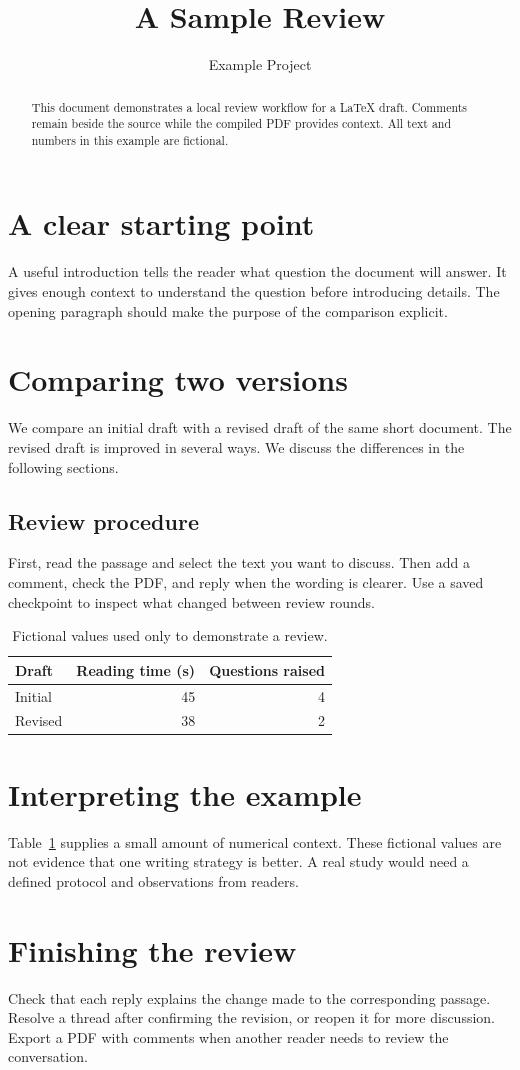 \documentclass[11pt]{article}
\title{A Sample Review}
\author{Example Project}
\date{}
\begin{document}
\maketitle

\begin{abstract}
This document demonstrates a local review workflow for a LaTeX draft.
Comments remain beside the source while the compiled PDF provides context.
All text and numbers in this example are fictional.
\end{abstract}

\section{A clear starting point}
A useful introduction tells the reader what question the document will answer.
It gives enough context to understand the question before introducing details.
The opening paragraph should make the purpose of the comparison explicit.

\section{Comparing two versions}
We compare an initial draft with a revised draft of the same short document.
The revised draft is improved in several ways.
We discuss the differences in the following sections.

\subsection{Review procedure}
First, read the passage and select the text you want to discuss.
Then add a comment, check the PDF, and reply when the wording is clearer.
Use a saved checkpoint to inspect what changed between review rounds.

\begin{table}[ht]
\centering
\caption{Fictional values used only to demonstrate a review.}
\label{tab:example}
\begin{tabular}{lrr}
\hline
Draft & Reading time (s) & Questions raised \\
\hline
Initial & 45 & 4 \\
Revised & 38 & 2 \\
\hline
\end{tabular}
\end{table}

\section{Interpreting the example}
Table~\ref{tab:example} supplies a small amount of numerical context.
These fictional values are not evidence that one writing strategy is better.
A real study would need a defined protocol and observations from readers.

\newpage
\section{Finishing the review}
Check that each reply explains the change made to the corresponding passage.
Resolve a thread after confirming the revision, or reopen it for more discussion.
Export a PDF with comments when another reader needs to review the conversation.
\end{document}
